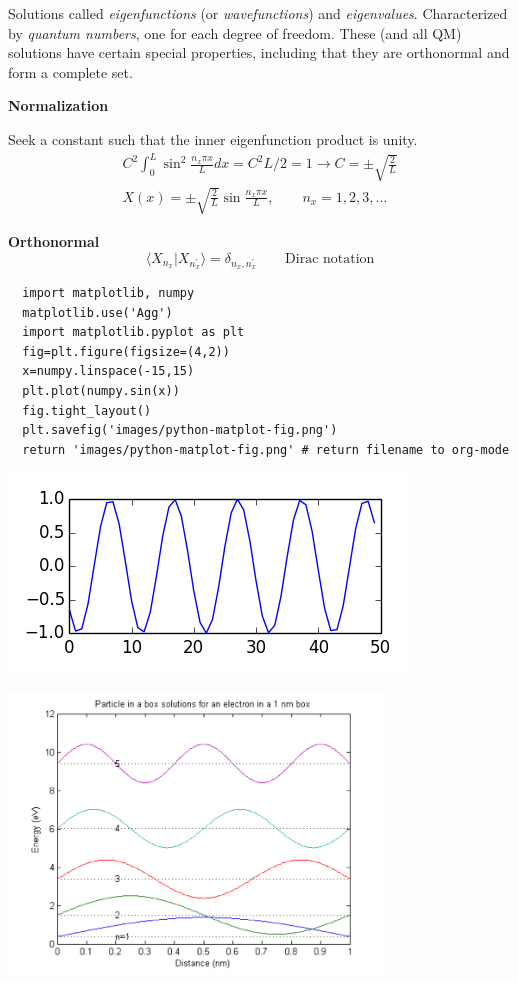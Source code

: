 \documentclass[11pt]{article}
\begin{document}
Solutions called \emph{eigenfunctions} (or \emph{wavefunctions}) and \emph{eigenvalues}.  Characterized
by \emph{quantum numbers}, one for each degree of freedom.  These (and all QM) solutions have certain
special properties, including that they are orthonormal and form a complete set.

\textbf{Normalization}

Seek a constant such that the inner eigenfunction product is unity.
\begin{eqnarray}
C^2 \int_0^L \sin^2 \frac{n_x\pi x}{L} dx = C^2 L/2 = 1 \rightarrow C=\pm\sqrt{\frac{2}{L}}\\
X(x) = \pm\sqrt{\frac{2}{L}}\sin\frac{n_x\pi x}{L},\qquad n_x = 1,2,3,\ldots
\end{eqnarray}

\textbf{Orthonormal}
\begin{equation}
\langle X_{n_x} | X_{n^\prime_x} \rangle = \delta_{n_{x},n_x^\prime}\qquad
\text{Dirac notation}
\end{equation}

\begin{verbatim}
  import matplotlib, numpy
  matplotlib.use('Agg')
  import matplotlib.pyplot as plt
  fig=plt.figure(figsize=(4,2))
  x=numpy.linspace(-15,15)
  plt.plot(numpy.sin(x))
  fig.tight_layout()
  plt.savefig('images/python-matplot-fig.png')
  return 'images/python-matplot-fig.png' # return filename to org-mode
\end{verbatim}

\includegraphics[width=.9\linewidth]{images/python-matplot-fig.png}



\includegraphics[width=0.75\textwidth]{./Images/SineWave.png}
\end{document}

